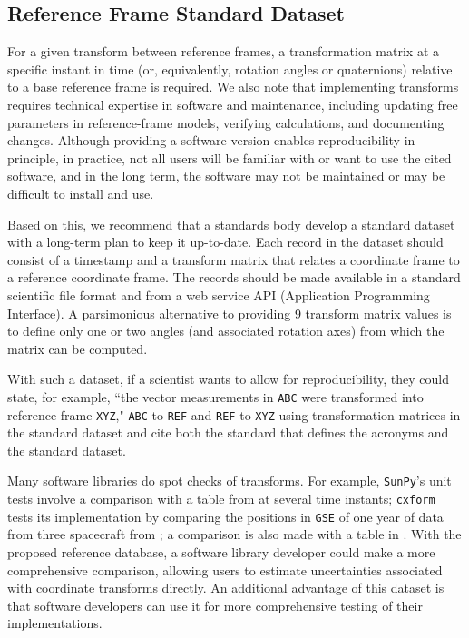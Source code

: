 \documentclass[draft]{agujournal2019}
\begin{document}
\subsection{Reference Frame Standard Dataset}
\label{sect:reference-dataset}

For a given transform between reference frames, a transformation matrix at a specific instant in time (or, equivalently, rotation angles or quaternions) relative to a base reference frame is required. We also note that implementing transforms requires technical expertise in software and maintenance, including updating free parameters in reference-frame models, verifying calculations, and documenting changes. Although providing a software version enables reproducibility in principle, in practice, not all users will be familiar with or want to use the cited software, and in the long term, the software may not be maintained or may be difficult to install and use. 

Based on this, we recommend that a standards body develop a standard dataset with a long-term plan to keep it up-to-date. Each record in the dataset should consist of a timestamp and a transform matrix that relates a coordinate frame to a reference coordinate frame. The records should be made available in a standard scientific file format and from a web service API (Application Programming Interface). A parsimonious alternative to providing 9 transform matrix values is to define only one or two angles (and associated rotation axes) from which the matrix can be computed.

With such a dataset, if a scientist wants to allow for reproducibility, they could state, for example, ``the vector measurements in \texttt{ABC} were transformed into reference frame \texttt{XYZ}," \texttt{ABC} to \texttt{REF} and \texttt{REF} to \texttt{XYZ} using transformation matrices in the standard dataset and cite both the standard that defines the acronyms and the standard dataset.

Many software libraries do spot checks of transforms. For example, \texttt{SunPy}'s unit tests \cite{SunPy} involve a comparison with a table from  at several time instants; \texttt{cxform} \cite{cxform} tests its implementation by comparing the positions in \texttt{GSE} of one year of data from three spacecraft from ; a comparison is also made with a table in . With the proposed reference database, a software library developer could make a more comprehensive comparison, allowing users to estimate uncertainties associated with coordinate transforms directly. An additional advantage of this dataset is that software developers can use it for more comprehensive testing of their implementations.
\end{document}
